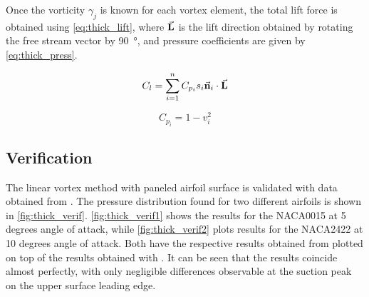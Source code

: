 Once the vorticity $\gamma_j$ is known for each vortex element, the total lift
force is obtained using \autoref{eq:thick_lift}, where $\vec{\bf{L}}$ is the
lift direction obtained by rotating the free stream vector by \SI{90}{\degree},
and pressure coefficients are given by \autoref{eq:thick_press}.
\smallskip

\begin{minipage}{.5\linewidth}
\begin{equation}
\label{eq:thick_lift}
C_l = \sum_{i=1}^{n} C_{p_i} s_i \vec{\bf{n}}_i \cdot \vec{\bf{L}}
\end{equation}
\end{minipage}
\begin{minipage}{.5\linewidth}
\begin{equation}
\label{eq:thick_press}
C_{p_i} = 1 - v_i^2
\end{equation}
\end{minipage}

\subsection{Verification}
The linear vortex method with paneled airfoil surface is validated with data
obtained from \xfoil\cite{xfoil}. The pressure distribution found for two
different airfoils is shown in \autoref{fig:thick_verif}.
\autoref{fig:thick_verif1}  shows the results for
the NACA0015 at 5 degrees angle of attack, while \autoref{fig:thick_verif2} plots results for
the NACA2422 at 10 degrees angle of attack. Both have the respective results
obtained from \xfoil plotted on top of the results obtained with \numfoil. It can be seen
that the results coincide almost perfectly, with only negligible differences
observable at the suction peak on the upper surface leading edge.

